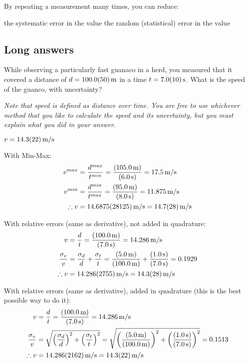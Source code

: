 \question By repeating a measurement many times, you can reduce:
\begin{checkboxes}
\choice the systematic error in the value
\CorrectChoice the random (statistical) error in the value \correct
\end{checkboxes}





%
%
\subsection{Long answers}

\question While observing a particularly fast guanaco in a herd, you measured that it covered a distance of $d=\SI{100.0\pm 5.0}{m}$ in a time $t=\SI{7.0 \pm 1.0}{s}$. What is the speed of the guanco, with uncertainty?

\textit{Note that speed is defined as distance over time. You are free to use whichever method that you like to calculate the speed and its uncertainty, but you must explain what you did in your answer.}

\begin{finalanswer}
$v = \SI{14.3\pm 2.2}{m/s}$
\end{finalanswer}

\begin{solution}
With Min-Max:
\begin{align*}
v^{max} &= \frac{d^{max}}{t^{min}}=\frac{(\SI{105.0}{m})}{(\SI{6.0}{s})}=\SI{17.5}{m/s}\\
v^{min} &= \frac{d^{min}}{t^{max}}=\frac{(\SI{95.0}{m})}{(\SI{8.0}{s})}=\SI{11.875}{m/s}\\
\therefore v &= \SI{14.6875 \pm 2.8125}{m/s}= \SI{14.7 \pm 2.8}{m/s}
\end{align*}

With relative errors (same as derivative), not added in quadrature:
\begin{align*}
v &= \frac{d}{t}=\frac{(\SI{100.0}{m})}{(\SI{7.0}{s})}=\SI{14.286}{m/s}\\
\frac{\sigma_v}{v} &= \frac{\sigma_d}{d}+\frac{\sigma_t}{t}=\frac{(\SI{5.0}{m})}{(\SI{100.0}{m})}+\frac{(\SI{1.0}{s})}{(\SI{7.0}{s})} = 0.1929\\
\therefore v &= \SI{14.286 \pm 2.755}{m/s}= \SI{14.3\pm 2.8}{m/s}
\end{align*}

With relative errors (same as derivative), added in quadrature (this is the best possible way to do it):
\begin{align*}
v &= \frac{d}{t}=\frac{(\SI{100.0}{m})}{(\SI{7.0}{s})}=\SI{14.286}{m/s}\\
\frac{\sigma_v}{v} &= \sqrt{ \left(\frac{\sigma_d}{d}\right)^2+\left(\frac{\sigma_t}{t} \right)^2}=\sqrt{ \left(\frac{(\SI{5.0}{m})}{(\SI{100.0}{m})}\right)^2+\left(\frac{(\SI{1.0}{s})}{(\SI{7.0}{s})}\right)^2} = 0.1513\\
\therefore v &= \SI{14.286 \pm 2.162}{m/s}= \SI{14.3\pm 2.2}{m/s}
\end{align*}
\end{solution}


